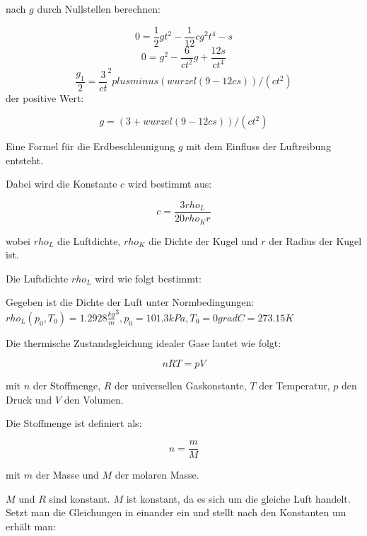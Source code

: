 \documentclass{protokoll}
\begin{document}
nach $g$ durch Nullstellen berechnen:

\begin{equation}
 0 = \frac{1}{2} g t^2 - \frac{1}{12} c g^2 t^4 - s 
\end{equation}
\begin{equation}
 0 = g^2 - \frac{6}{ct^2} g + \frac{12s}{ct^4} 
\end{equation}
\begin{equation}
 \frac{g_1}{2} = \frac{3}{ct}^2 plusminus (wurzel(9 - 12cs))/(ct^2) 
\end{equation}
der positive Wert:

\begin{equation}
 g = (3 + wurzel(9 - 12cs))/(ct^2) 
\end{equation}

Eine Formel für die Erdbeschleunigung $g$ mit dem Einfluss der Luftreibung entsteht.

Dabei wird die Konstante $c$ wird bestimmt aus:

\begin{equation}
c = \frac{3 rho_L}{20 rho_K r}
\end{equation}

wobei $rho_L$ die Luftdichte, $rho_K$ die Dichte der Kugel 
und $r$ der Radius der Kugel ist.

Die Luftdichte $rho_L$ wird wie folgt bestimmt:

Gegeben ist die Dichte der Luft unter Normbedingungen: 
$ rho_L (p_0, T_0) = 1.2928 \frac{kg}{m}^3, p_0 = 101.3 kPa, 
T_0 = 0gradC = 273.15 K$

Die thermische Zustandsgleichung idealer Gase lautet wie folgt:

\begin{equation}
nRT = pV
\end{equation}

mit $n$ der Stoffmenge, $R$ der universellen Gaskonstante, 
$T$ der Temperatur, $p$ den Druck und $V$ den Volumen.

Die Stoffmenge ist definiert als:

\begin{equation}
 n = \frac{m}{M} 
\end{equation}

mit $m$ der Masse und $M$ der molaren Masse.

$M$ und $R$ sind konstant. $M$ ist konstant, da es sich 
um die gleiche Luft handelt. Setzt man die Gleichungen 
in einander ein und stellt nach den Konstanten um erhält man:
\end{document}
